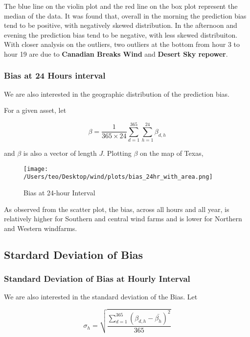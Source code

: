 \documentclass[
]{article}
\begin{document}
The blue line on the violin plot and the red line on the box plot
represent the median of the data. It was found that, overall in the
morning the prediction bias tend to be positive, with negatively skewed
distribution. In the afternoon and evening the prediction bias tend to
be negative, with less skewed distribuiton. With closer analysis on the
outliers, two outliers at the bottom from hour 3 to hour 19 are due to
\textbf{Canadian Breaks Wind} and \textbf{Desert Sky repower}.

\hypertarget{bias-at-24-hours-interval}{%
\subsubsection{Bias at 24 Hours
interval}\label{bias-at-24-hours-interval}}

We are also interested in the geographic distribution of the prediction
bias.

For a given asset, let

\[\beta = \frac{1}{365\times 24}\sum_{d = 1}^{365} \sum_{h = 1}^{24} \beta_{d,h}\]

and \(\beta\) is also a vector of length \(J\). Plotting \(\beta\) on
the map of Texas,

\begin{figure}
\centering
\texttt{[image: /Users/teo/Desktop/wind/plots/bias\_24hr\_with\_area.png]}
\caption{Bias at 24-hour Interval}
\end{figure}

As observed from the scatter plot, the bias, across all hours and all
year, is relatively higher for Southern and central wind farms and is
lower for Northern and Western windfarms.

\hypertarget{stardard-deviation-of-bias}{%
\subsection{Stardard Deviation of
Bias}\label{stardard-deviation-of-bias}}

\hypertarget{standard-deviation-of-bias-at-hourly-interval}{%
\subsubsection{Standard Deviation of Bias at Hourly
Interval}\label{standard-deviation-of-bias-at-hourly-interval}}

We are also interested in the standard deviation of the Bias. Let

\[\sigma_{h}=\sqrt{\frac{\sum_{d = 1}^{365}\left(\beta_{d,h}-\bar{\beta_h}\right)^{2}}{365}}\]
\end{document}
